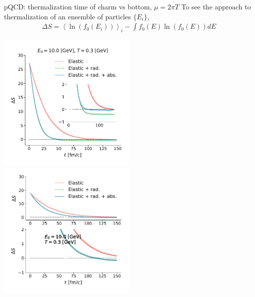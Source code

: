 \documentclass[11pt]{beamer}
\begin{document}
\begin{frame}{pQCD: thermalization time of charm vs bottom, $\mu = 2\pi T$}
To see the approach to thermalization of an ensemble of particles $\{E_i\}$,
\begin{eqnarray}
\nonumber
\Delta S = \left\langle \ln(f_0(E_i)) \right\rangle_i - \int f_0(E) \ln(f_0(E)) dE
\end{eqnarray}
\begin{center}
\includegraphics[width=0.5\textwidth]{fig/charm-plot/thermalization.pdf}
\includegraphics[width=0.5\textwidth]{fig/bottom-plot/thermalization.pdf}
\end{center}
\end{frame}
\end{document}
